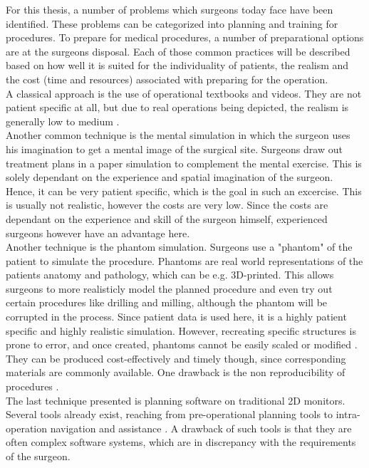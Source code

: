 For this thesis, a number of problems which surgeons today face have been identified.
These problems can be categorized into planning and training for procedures.
To prepare for medical procedures, a number of preparational options are at the surgeons disposal.
Each of those common practices will be described based on how well it is suited for the individuality of patients, the realism and the cost (time and resources) 
associated with preparing for the operation.
\\ A classical approach is the use of operational textbooks and videos.
They are not patient specific at all, but due to real operations being depicted, the realism is generally low to medium \cite{Ellis.2005}.
\\ Another common technique is the mental simulation in which the surgeon uses his imagination to get a mental image of the surgical site.
Surgeons draw out treatment plans in a paper simulation to complement the mental exercise.
This is solely dependant on the experience and spatial imagination of the surgeon. 
Hence, it can be very patient specific, which is the goal in such an excercise.
This is usually not realistic, however the costs are very low.
Since the costs are dependant on the experience and skill of the surgeon himself, experienced surgeons however have an advantage here.
\\ Another technique is the phantom simulation.
Surgeons use a "phantom" of the patient to simulate the procedure.
Phantoms are real world representations of the patients anatomy and pathology, which can be e.g. 3D-printed.
This allows surgeons to more realisticly model the planned procedure and even try out certain procedures like drilling and milling, although the phantom will be corrupted in the process.
Since patient data is used here, it is a highly patient specific and highly realistic simulation.
However, recreating specific structures is prone to error, and once created, phantoms cannot be easily scaled or modified \cite{TejoOtero.2020}.
They can be produced cost-effectively and timely though, since corresponding materials are commonly available.
One drawback is the non reproducibility of procedures \cite{richardson2015cost}.
\\ The last technique presented is planning software on traditional 2D monitors.
Several tools already exist, reaching from pre-operational planning tools to intra-operation navigation and assistance \cite{HASSFELD20012}.
A drawback of such tools is that they are often complex software systems, which are in discrepancy with the requirements of the surgeon.
